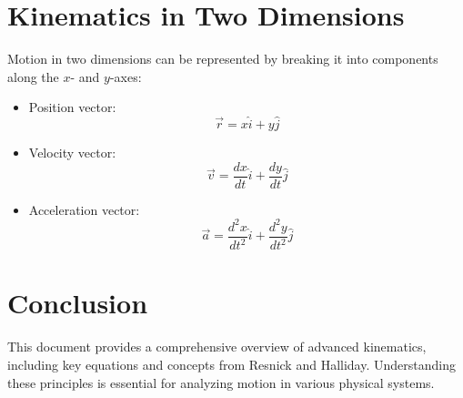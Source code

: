 \documentclass[a4paper,12pt]{article}
\begin{document}
\section{Kinematics in Two Dimensions}
Motion in two dimensions can be represented by breaking it into components along the \(x\)- and \(y\)-axes:
\begin{itemize}
    \item Position vector:
    \[
    \vec{r} = x\hat{i} + y\hat{j}
    \]
    \item Velocity vector:
    \[
    \vec{v} = \frac{dx}{dt}\hat{i} + \frac{dy}{dt}\hat{j}
    \]
    \item Acceleration vector:
    \[
    \vec{a} = \frac{d^2x}{dt^2}\hat{i} + \frac{d^2y}{dt^2}\hat{j}
    \]
\end{itemize}

\section*{Conclusion}
This document provides a comprehensive overview of advanced kinematics, including key equations and concepts from Resnick and Halliday. Understanding these principles is essential for analyzing motion in various physical systems.
\end{document}
